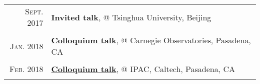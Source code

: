 \documentclass[letterpaper,10pt]{article}
\begin{document}
\begin{longtable}{r|p{5.5in}}
    \textsc{Sept. 2017}   &   \textbf{Invited talk}, @ Tsinghua University, Beijing \\
    \multicolumn{2}{c}{} \\

    \textsc{Jan. 2018}   &   \href{http://obs.carnegiescience.edu/talk_event/828}{\textbf{Colloquium talk}}, @ Carnegie Observatories, Pasadena, CA \\
    \multicolumn{2}{c}{} \\

    \textsc{Feb. 2018}   &   \href{https://www.ipac.caltech.edu/event/358}{\textbf{Colloquium talk}}, @ IPAC, Caltech, Pasadena, CA \\
    \multicolumn{2}{c}{} \\

\end{longtable}


\end{document}
